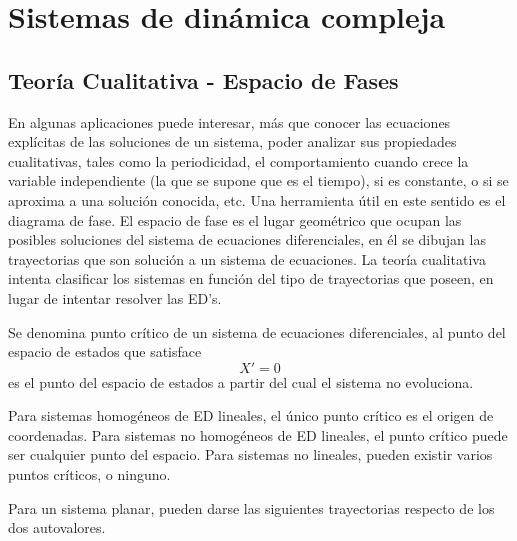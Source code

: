 \chapter{Sistemas de dinámica compleja}



\section{Teoría Cualitativa - Espacio de Fases}
En algunas aplicaciones puede interesar, más que conocer las ecuaciones explícitas de las soluciones de un sistema, poder analizar sus propiedades cualitativas, tales como la periodicidad, el comportamiento cuando crece la variable independiente (la que se supone que es el tiempo), si es constante, o si se aproxima a una solución conocida, etc.
Una herramienta útil en este sentido es el diagrama de fase.
El espacio de fase es el lugar geométrico que ocupan las posibles soluciones del sistema de ecuaciones diferenciales, en él se dibujan las trayectorias que son solución a un sistema de ecuaciones.
La teoría cualitativa intenta clasificar los sistemas en función del tipo de trayectorias que poseen, en lugar de intentar resolver las ED’s.

Se denomina punto crítico de un sistema de ecuaciones diferenciales, al punto del espacio de estados que satisface 
\begin{equation}
X'=0
\end{equation}
es el punto del espacio de estados a partir del cual el sistema no evoluciona.

Para sistemas homogéneos de ED lineales, el único punto crítico es el origen de coordenadas. Para sistemas no homogéneos de ED lineales, el punto crítico puede ser cualquier punto del espacio. Para sistemas no lineales, pueden existir varios puntos críticos, o ninguno.

Para un sistema planar, pueden darse las siguientes trayectorias respecto de los dos autovalores.

